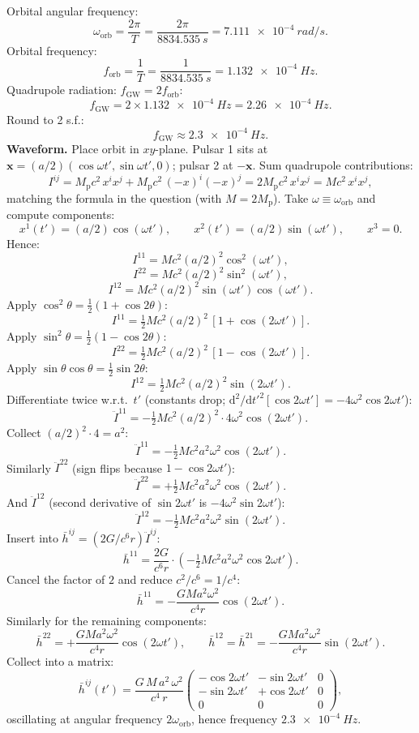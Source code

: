 \documentclass[11pt]{article}
\newcommand{\de}{\mathrm{d}}
\begin{document}
Orbital angular frequency:
\[
\omega_{\mathrm{orb}} = \frac{2\pi}{T} = \frac{2\pi}{\SI{8834.535}{s}} = \SI{7.111e-4}{rad/s}.
\]
Orbital frequency:
\[
f_{\mathrm{orb}} = \frac{1}{T} = \frac{1}{\SI{8834.535}{s}} = \SI{1.132e-4}{Hz}.
\]
Quadrupole radiation: $f_{\mathrm{GW}} = 2 f_{\mathrm{orb}}$:
\[
f_{\mathrm{GW}} = 2\times \SI{1.132e-4}{Hz} = \SI{2.26e-4}{Hz}.
\]
Round to 2 s.f.:
\[
\boxed{\;f_{\mathrm{GW}} \approx \SI{2.3e-4}{Hz}.\;}
\]
\textbf{Waveform.} Place orbit in $xy$-plane. Pulsar 1 sits at $\bm x = (a/2)(\cos\omega t', \sin\omega t', 0)$; pulsar 2 at $-\bm x$. Sum quadrupole contributions:
\[
I^{ij} = M_{\mathrm p}c^2\,x^i x^j + M_{\mathrm p}c^2\,(-x)^i(-x)^j = 2 M_{\mathrm p}c^2\,x^i x^j = M c^2\,x^i x^j,
\]
matching the formula in the question (with $M = 2 M_{\mathrm p}$). Take $\omega \equiv \omega_{\mathrm{orb}}$ and compute components:
\[
x^1(t') = (a/2)\cos(\omega t'),\qquad x^2(t') = (a/2)\sin(\omega t'),\qquad x^3 = 0.
\]
Hence:
\[
I^{11} = M c^2 (a/2)^2\cos^2(\omega t'),
\]
\[
I^{22} = M c^2 (a/2)^2\sin^2(\omega t'),
\]
\[
I^{12} = M c^2 (a/2)^2\sin(\omega t')\cos(\omega t').
\]
Apply $\cos^2\theta = \tfrac12(1+\cos 2\theta)$:
\[
I^{11} = \tfrac{1}{2}M c^2 (a/2)^2\,[1+\cos(2\omega t')].
\]
Apply $\sin^2\theta = \tfrac12(1-\cos 2\theta)$:
\[
I^{22} = \tfrac{1}{2}M c^2 (a/2)^2\,[1-\cos(2\omega t')].
\]
Apply $\sin\theta\cos\theta = \tfrac12\sin 2\theta$:
\[
I^{12} = \tfrac{1}{2}M c^2 (a/2)^2\sin(2\omega t').
\]
Differentiate twice w.r.t.\ $t'$ (constants drop; $\de^2/\de t'^2[\cos 2\omega t']=-4\omega^2\cos 2\omega t'$):
\[
\ddot I^{11} = -\tfrac{1}{2}M c^2 (a/2)^2 \cdot 4\omega^2\cos(2\omega t').
\]
Collect $(a/2)^2\cdot 4 = a^2$:
\[
\ddot I^{11} = -\tfrac{1}{2}M c^2 a^2 \omega^2\cos(2\omega t').
\]
Similarly $\ddot I^{22}$ (sign flips because $1-\cos 2\omega t'$):
\[
\ddot I^{22} = +\tfrac{1}{2}M c^2 a^2\omega^2\cos(2\omega t').
\]
And $\ddot I^{12}$ (second derivative of $\sin 2\omega t'$ is $-4\omega^2\sin 2\omega t'$):
\[
\ddot I^{12} = -\tfrac{1}{2}M c^2 a^2\omega^2\sin(2\omega t').
\]
Insert into $\bar h^{ij} = (2G/c^6 r)\ddot I^{ij}$:
\[
\bar h^{11} = \frac{2G}{c^6 r}\cdot\!\left(-\tfrac{1}{2}M c^2 a^2 \omega^2\cos 2\omega t'\right).
\]
Cancel the factor of $2$ and reduce $c^2/c^6 = 1/c^4$:
\[
\bar h^{11} = -\frac{G M a^2\omega^2}{c^4 r}\cos(2\omega t').
\]
Similarly for the remaining components:
\[
\bar h^{22} = +\frac{G M a^2\omega^2}{c^4 r}\cos(2\omega t'),\qquad \bar h^{12} = \bar h^{21} = -\frac{G M a^2\omega^2}{c^4 r}\sin(2\omega t').
\]
Collect into a matrix:
\[
\boxed{\;\bar h^{ij}(t') = \frac{G\,M\,a^2\,\omega^2}{c^4\,r}\begin{pmatrix}-\cos 2\omega t' & -\sin 2\omega t' & 0\\ -\sin 2\omega t' & +\cos 2\omega t' & 0 \\ 0 & 0 & 0\end{pmatrix},\;}
\]
oscillating at angular frequency $2\omega_{\mathrm{orb}}$, hence frequency $\SI{2.3e-4}{Hz}$.
\end{document}
